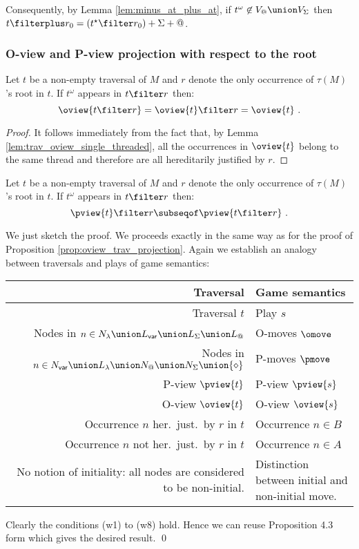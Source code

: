 Consequently, by Lemma \ref{lem:minus_at_plus_at}, if $t^\omega
\not\in V_@ \union V_\Sigma$ then $t \filterplus r_0 =
(t^\star\filter r_0) +\Sigma+@$.



\subsubsection{O-view and P-view projection with respect to the root}
\begin{lemma}
\label{lem:trav_projection} Let $t$ be a non-empty traversal of $M$
and $r$ denote the only occurrence of $\tau(M)$'s root in $t$. If
$t^\omega$ appears in $t\filter r$ then:
$$\oview{t\filter r} = \oview{t}\filter r = \oview{t} \ .$$
\end{lemma}
\begin{proof}
It follows immediately from the fact that, by Lemma \ref{lem:trav_oview_single_threaded}, all the occurrences in $\oview{t}$ belong to the same thread and therefore are all hereditarily justified by $r$.
\end{proof}

\begin{lemma}
\label{lem:trav_pview_red}
Let $t$ be a non-empty traversal of $M$ and $r$ denote the only occurrence of $\tau(M)$'s
root in $t$. If $t^\omega$ appears in $t\filter r$ then:
$$ \pview{t} \filter r \subseqof \pview{t \filter r} \  .$$
\end{lemma}
\proof We just sketch the proof. We proceeds exactly in the same way
as for the proof of Proposition \ref{prop:oview_trav_projection}.
Again we establish an analogy between traversals and plays of game
semantics:
\begin{center}
\begin{tabular}{r|p{5cm}}
{Traversal} & {Game semantics} \\
\hline
Traversal $t$ & Play $s$ \\
Nodes in $n \in N_\lambda \union L_{\sf var} \union L_\Sigma \union L_@$ & O-moves $\omove$ \\
Nodes in $n \in N_{\sf var} \union L_\lambda \union N_@ \union N_\Sigma \union \{\diamond\}$ & P-moves $\pmove$\\
P-view $\pview{t}$  & P-view $\pview{s}$\\
O-view $\oview{t}$  & O-view $\oview{s}$\\
Occurrence $n$ her.\ just.\ by $r$ in $t$ & Occurrence $n \in B$ \\
Occurrence $n$ not her.\ just.\ by $r$ in $t$ & Occurrence $n \in A$ \\
\parbox[t]{6cm}{\raggedleft No notion of initiality: all nodes are considered to be non-initial.} & Distinction between initial and non-initial move.
\end{tabular}
\end{center}
Clearly the conditions (w1) to (w8) hold. Hence we can reuse Proposition 4.3 form \cite{hylandong_pcf} which gives the desired result. \qed
\bigskip

